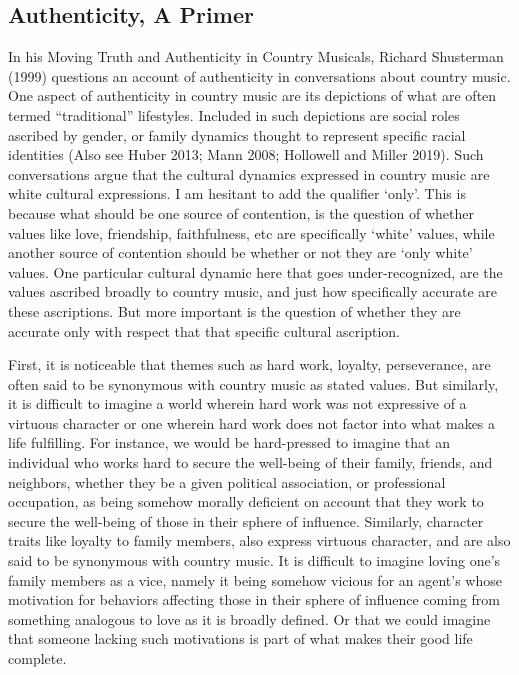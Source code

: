 \documentclass[
  letterpaper,
  DIV=11,
  numbers=noendperiod]{scrartcl}
\theoremstyle{remark}
\begin{document}
\subsection{Authenticity, A Primer}\label{authenticity-a-primer}

In his Moving Truth and Authenticity in Country Musicals, Richard
Shusterman (1999) questions an account of authenticity in conversations
about country music. One aspect of authenticity in country music are its
depictions of what are often termed ``traditional'' lifestyles. Included
in such depictions are social roles ascribed by gender, or family
dynamics thought to represent specific racial identities (Also see Huber
2013; Mann 2008; Hollowell and Miller 2019). Such conversations argue
that the cultural dynamics expressed in country music are white cultural
expressions. I am hesitant to add the qualifier `only'. This is because
what should be one source of contention, is the question of whether
values like love, friendship, faithfulness, etc are specifically `white'
values, while another source of contention should be whether or not they
are `only white' values. One particular cultural dynamic here that goes
under-recognized, are the values ascribed broadly to country music, and
just how specifically accurate are these ascriptions. But more important
is the question of whether they are accurate only with respect that that
specific cultural ascription.

First, it is noticeable that themes such as hard work, loyalty,
perseverance, are often said to be synonymous with country music as
stated values. But similarly, it is difficult to imagine a world wherein
hard work was not expressive of a virtuous character or one wherein hard
work does not factor into what makes a life fulfilling. For instance, we
would be hard-pressed to imagine that an individual who works hard to
secure the well-being of their family, friends, and neighbors, whether
they be a given political association, or professional occupation, as
being somehow morally deficient on account that they work to secure the
well-being of those in their sphere of influence. Similarly, character
traits like loyalty to family members, also express virtuous character,
and are also said to be synonymous with country music. It is difficult
to imagine loving one's family members as a vice, namely it being
somehow vicious for an agent's whose motivation for behaviors affecting
those in their sphere of influence coming from something analogous to
love as it is broadly defined. Or that we could imagine that someone
lacking such motivations is part of what makes their good life complete.
\end{document}
